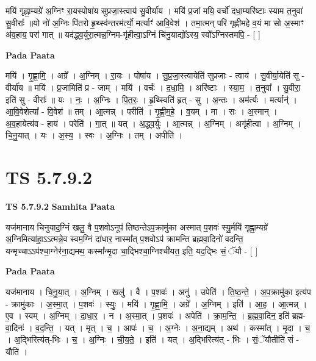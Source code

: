 \documentclass[17pt]{extarticle}
\begin{document}
मयि॑ गृह्णा॒म्यग्रे॑ अ॒ग्निꣳ रा॒यस्पोषा॑य सुप्रजा॒स्त्वाय॑ सु॒वीर्या॑य । मयि॑ प्र॒जां मयि॒ वर्चो॑ दधा॒म्यरि॑ष्टाः स्याम त॒नुवा॑ सु॒वीराः᳚ ॥यो नो॑ अ॒ग्निः पि॑तरो हृ॒थ्स्व॑न्तरम॑र्त्यो॒ मर्त्याꣳ॑ आवि॒वेश॑ । तमा॒त्मन् परि॑ गृह्णीमहे व॒यं मा सो अ॒स्माꣳ अ॑व॒हाय॒ परा॑ गात् ॥ यद॑द्ध्व॒र्युरा॒त्मन्न॒ग्निम-गृ॑हीत्वा॒ऽग्निं चि॑नु॒याद्यो᳚ऽस्य॒ स्वो᳚ऽग्निस्तमपि॒ - [  ] \newline

\textbf{Pada Paata} \newline

मयि॑ । गृ॒ह्णा॒मि॒ । अग्रे᳚ । अ॒ग्निम् । रा॒यः । पोषा॑य । सु॒प्र॒जा॒स्त्वायेति॑ सुप्रजाः - त्वाय॑ । सु॒वीर्या॒येति॑ सु - वीर्या॑य ॥ मयि॑ । प्र॒जामिति॑ प्र - जाम् । मयि॑ । वर्चः॑ । द॒धा॒मि॒ । अरि॑ष्टाः । स्या॒म॒ । त॒नुवा᳚ । सु॒वीरा॒ इति॑ सु - वीराः᳚ ॥ यः । नः॒ । अ॒ग्निः । पि॒त॒रः॒ । हृ॒थ्स्विति॑ हृत् - सु । अ॒न्तः । अम॑र्त्यः । मर्त्यान्॑ । आ॒वि॒वेशेत्या᳚ - वि॒वेश॑ ॥ तम् । आ॒त्मन्न् । परीति॑ । गृ॒ह्णी॒म॒हे॒ । व॒यम् । मा । सः । अ॒स्मान् । अ॒व॒हायेत्य॑व - हाय॑ । परेति॑ । गा॒त् ॥ यत् । अ॒द्ध्व॒र्युः । आ॒त्मन्न् । अ॒ग्निम् । अगृ॑हीत्वा । अ॒ग्निम् । चि॒नु॒यात् । यः । अ॒स्य॒ । स्वः । अ॒ग्निः । तम् । अपीति॑ ।  \newline





\section{ TS 5.7.9.2 }

\textbf{TS 5.7.9.2 } \newline
\textbf{Samhita Paata} \newline

यज॑मानाय चिनुयाद॒ग्निं खलु॒ वै प॒शवोऽनूप॑ तिष्ठन्तेऽप॒क्रामु॑का अस्मात् प॒शवः॑ स्यु॒र्मयि॑ गृह्णा॒म्यग्रे॑ अ॒ग्निमित्या॑हा॒ऽऽत्मन्ने॒व स्वम॒ग्निं दा॑धार॒ नास्मा᳚त् प॒शवोऽप॑ क्रामन्ति ब्रह्मवा॒दिनो॑ वदन्ति॒ यन्मृच्चाऽऽप॑श्चा॒ग्नेर॑ना॒द्यमथ॒ कस्मा᳚न्मृ॒दा चा॒द्भिश्चा॒ग्निश्ची॑यत॒ इति॒ यद॒द्भिः सं॒ ॅयौ - [  ] \newline

\textbf{Pada Paata} \newline

यज॑मानाय । चि॒नु॒या॒त् । अ॒ग्निम् । खलु॑ । वै । प॒शवः॑ । अनु॑ । उपेति॑ । ति॒ष्ठ॒न्ते॒ । अ॒प॒क्रामु॑का॒ इत्य॑प - क्रामु॑काः । अ॒स्मा॒त् । प॒शवः॑ । स्युः॒ । मयि॑ । गृ॒ह्णा॒मि॒ । अग्रे᳚ । अ॒ग्निम् । इति॑ । आ॒ह॒ । आ॒त्मन्न् । ए॒व । स्वम् । अ॒ग्निम् । दा॒धा॒र॒ । न । अ॒स्मा॒त् । प॒शवः॑ । अपेति॑ । क्रा॒म॒न्ति॒ । ब्र॒ह्म॒वा॒दिन॒ इति॑ ब्रह्म-वा॒दिनः॑ । व॒द॒न्ति॒ । यत् । मृत् । च॒ । आपः॑ । च॒ । अ॒ग्नेः । अ॒ना॒द्यम् । अथ॑ । कस्मा᳚त् । मृ॒दा । च॒ । अ॒द्भिरित्य॑त्-भिः । च॒ । अ॒ग्निः । ची॒य॒ते॒ । इति॑ । यत् । अ॒द्भिरित्य॑त् - भिः । सं॒ॅयौतीति॑ सं - यौति॑ ।  \newline
\end{document}
